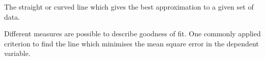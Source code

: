 The straight or curved line which gives the best approximation to a given set of data. 
\par
Different measures are possible to describe goodness of fit. One commonly applied criterion to find the line which minimises the mean square error in the dependent variable.